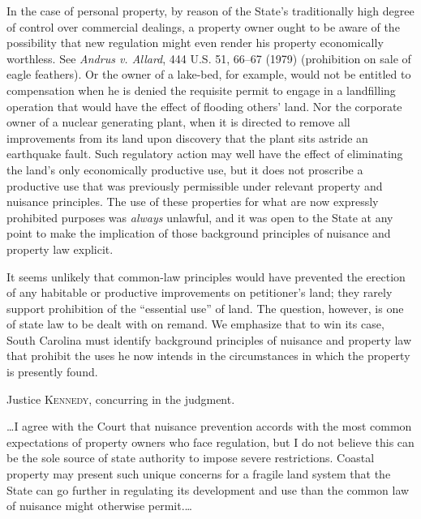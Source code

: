In the case of personal property, by reason of the State's
traditionally high degree of control over commercial dealings, a property owner
ought to be aware of the possibility that new regulation might even render his
property economically worthless. See \textit{Andrus v. Allard},
444 U.S. 51, 66--67 (1979) (prohibition on sale of eagle feathers).
Or the owner of a lake-bed, for example, would not be entitled to
compensation when he is denied the requisite permit to engage in a landfilling
operation that would have the effect of flooding others' land. Nor the corporate
owner of a nuclear generating plant, when it is directed to remove all
improvements from its land upon discovery that the plant sits astride an
earthquake fault. Such regulatory action may well have the effect of eliminating
the land's only economically productive use, but it does not proscribe a
productive use that was previously permissible under relevant property and
nuisance principles. The use of these properties for what are now expressly
prohibited purposes was \textit{always} unlawful, and it was open to the State
at any point to make the
implication of those background principles of nuisance and property law
explicit.

It seems unlikely that common-law principles would have prevented the erection
of any habitable or productive improvements on petitioner's land; they rarely
support prohibition of the ``essential use'' of land. The question, however, is
one of state law to be dealt with on remand. We emphasize that to win its case,
South Carolina must identify background
principles of nuisance and property law that prohibit the uses he now intends in
the circumstances in which the property is presently found.

\opinion Justice \textsc{Kennedy}, concurring in the judgment.

\ldots I agree with the Court that nuisance prevention accords with the
most common expectations of property owners who face regulation, but I do not
believe this can be the sole source of state authority to impose severe
restrictions. Coastal property may present such unique concerns for a fragile
land system that the State can go further in regulating its development and use
than the common law of nuisance might otherwise permit.\ldots

